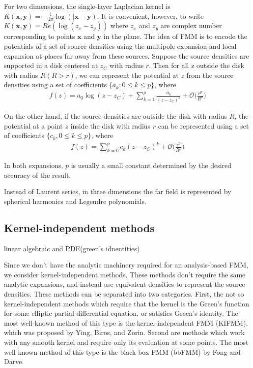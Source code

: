 \documentclass[11pt, oneside]{article}   	%
\begin{document}
For two dimensions, the single-layer Laplacian kernel is $K(\mathbf{x},\mathbf{y})=-\frac{1}{2\pi}\log(|\mathbf{x}-\mathbf{y})$. It is convenient, however, to write $K(\mathbf{x},\mathbf{y})=Re(\log(z_x-z_y))$ where $z_x$ and $z_y$ are complex number corresponding to points $\mathbf{x}$ and $\mathbf{y}$ in the plane. The idea of FMM is to encode the potentials of a set of source densities using the multipole expansion and local expansion at places far away from these sources. Suppose the source densities are supported in a disk centered at $z_C$ with radius $r$. Then for all z outside the disk with radius $R (R > r)$, we can represent the potential at $z$ from the source densities using a set of coefficients $\{a_k ; 0 \le k \le p\}$, where
\begin{align}
f(z)=a_0\log(z-z_C)+\sum_{k=1}^p\frac{a_k}{(z-z_C)^k}+\mathcal{O}\bigg(\frac{r^p}{R^p}\bigg)
\end{align}

On the other hand, if the source densities are outside the disk with radius $R$, the potential at a point $z$ inside the disk with radius $r$ can be represented using a set of coefficients $\{c_k, 0\le k\le p\}$, where
\begin{align}
f(z)=\sum_{k=0}^pc_k(z-z_C)^k+\mathcal{O}\bigg(\frac{r^p}{R^p}\bigg)
\end{align}

In both expansions, $p$ is usually a small constant determined by the desired accuracy of the result.

Instead of Laurent series, in three dimensions the far field is represented by spherical harmonics and Legendre polynomials.

\subsection{Kernel-independent methods}

linear algebraic and PDE(green's idnentities)

Since we don't have the analytic machinery required for an analysis-based FMM, we consider kernel-independent methods. These methods don't require the same analytic expansions, and instead use equivalent densities to represent the source densities. These methods can be separated into two categories. First, the not so kernel-independent methods which require that the kernel is the Green's function for some elliptic partial differential equation, or satisfies Green's identity. The most well-known method of this type is the kernel-independent FMM (KIFMM), which was proposed by Ying, Biros, and Zorin. Second are methods which work with any smooth kernel and require only its evaluation at some points. The most well-known method of this type is the black-box FMM (bbFMM) by Fong and Darve.
\end{document}
